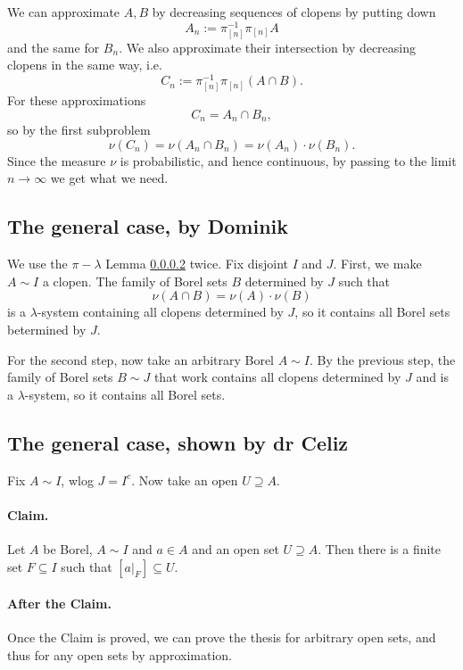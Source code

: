 We can approximate \( A, B \) by decreasing sequences of clopens by putting down
\[
    A_n := \pi_{[n]}^{-1} \pi_{[n]} A
\]
and the same for \( B_n \). We also approximate their intersection by decreasing clopens in the same way, i.e.
\[ 
    C_n := \pi_{[n]}^{-1} \pi_{[n]} (A \cap B).
\]
For these approximations
\[ 
    C_n = A_n \cap B_n, 
\]
so by the first subproblem
\[ 
    \nu(C_n) = \nu(A_n \cap B_n) = \nu(A_n) \cdot \nu(B_n).
\]
Since the measure \( \nu \) is probabilistic, and hence continuous, by passing to the limit \( n \to \infty \) we get what we need.

\subsection*{The general case, by Dominik}

We use the \( \pi -\lambda \) Lemma \ref{} twice. Fix disjoint \( I \) and \( J \). First, we make \( A \sim I \) a clopen. The family of Borel sets \( B  \) determined by \( J \) such that
\[ 
    \nu ( A \cap B ) = \nu(A) \cdot \nu(B)
\]
is a \(\lambda\)-system containing all clopens determined by \( J \), so it contains all Borel sets betermined by \( J \).

For the second step, now take an arbitrary Borel \( A \sim I \). By the previous step, the family of Borel sets \( B \sim J \) that work contains all clopens determined by \( J \) and is a \(\lambda \)-system, so it contains all Borel sets.

\subsection*{The general case, shown by dr Celiz}

Fix \( A \sim I \), wlog \( J = I^c \). Now take an open \( U \supseteq A \).

\paragraph{Claim.} Let \( A \) be Borel, \( A \sim I \) and \( a \in A \) and an open set \( U \supseteq A \). Then there is a finite set \( F \subseteq I \) such that \( [a|_F] \subseteq U \).

\paragraph{After the Claim.} Once the Claim is proved, we can prove the thesis for arbitrary open sets, and thus for any open sets by approximation.

